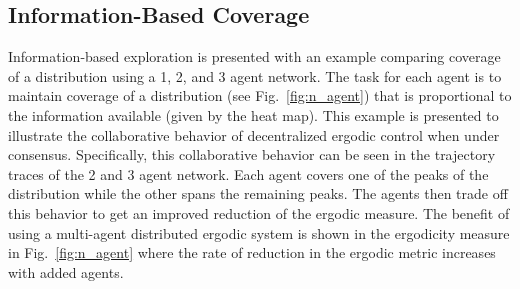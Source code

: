 \documentclass[conference]{IEEEtran}
\begin{document}
\subsection{Information-Based Coverage}

Information-based exploration is presented with an example comparing coverage of a distribution using a 1, 2, and 3 agent network. The task for each agent is to maintain coverage of a distribution (see Fig.~\ref{fig:n_agent}) that is proportional to the information available (given by the heat map). This example is presented to illustrate the collaborative behavior of decentralized ergodic control when under consensus. Specifically, this collaborative behavior can be seen in the trajectory traces of the 2 and 3 agent network. Each agent covers one of the peaks of the distribution while the other spans the remaining peaks. The agents then trade off this behavior to get an improved reduction of the ergodic measure. The benefit of using a multi-agent distributed ergodic system is shown in the ergodicity measure in Fig.~\ref{fig:n_agent} where the rate of reduction in the ergodic metric increases with added agents.
\end{document}
